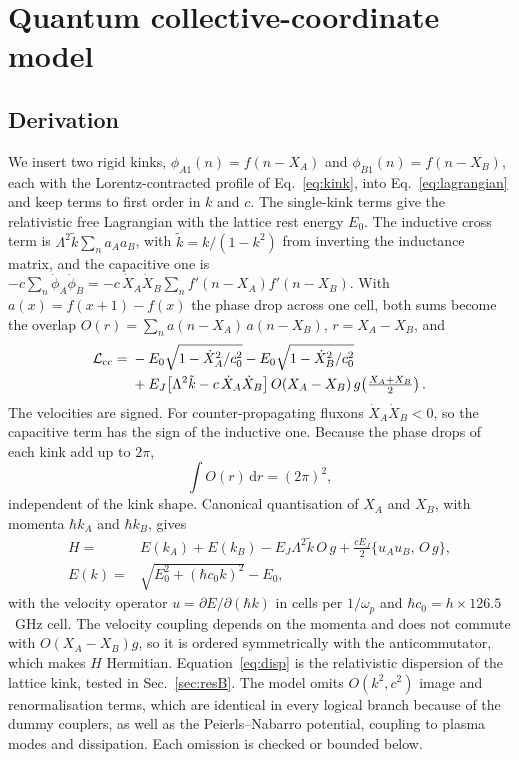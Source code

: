 \documentclass[10pt,twocolumn,letterpaper]{article}
\newcommand{\kt}{\tilde{k}}
\newcommand{\ud}{\mathrm{d}}
\begin{document}
\section{Quantum collective-coordinate model}
\label{sec:quantum}

\subsection{Derivation}
We insert two rigid kinks, $\phi_{A1}(n)=f(n-X_A)$ and $\phi_{B1}(n)=f(n-X_B)$, each with the Lorentz-contracted
profile of Eq.~\eqref{eq:kink}, into Eq.~\eqref{eq:lagrangian} and keep terms to first order in $k$ and $c$. The
single-kink terms give the relativistic free Lagrangian with the lattice rest energy $E_0$. The inductive cross term is
$\Lambda^2\kt\sum_n a_Aa_B$, with $\kt=k/(1-k^2)$ from inverting the inductance matrix, and the capacitive one is
$-c\sum_n\dot\phi_A\dot\phi_B=-c\,\dot X_A\dot X_B\sum_n f'(n-X_A)f'(n-X_B)$. With $a(x)=f(x+1)-f(x)$ the phase drop
across one cell, both sums become the overlap $O(r)=\sum_n a(n-X_A)\,a(n-X_B)$, $r=X_A-X_B$, and
\begin{align}
\mathcal L_{\rm cc}={}&-E_0\sqrt{1-\dot X_A^2/c_0^2}-E_0\sqrt{1-\dot X_B^2/c_0^2}\nonumber\\
&+E_J\big[\Lambda^2\kt-c\,\dot X_A\dot X_B\big]\,O(X_A-X_B)\,g\!\left(\tfrac{X_A+X_B}{2}\right).
\label{eq:Lcc}
\end{align}
The velocities are signed. For counter-propagating fluxons $\dot X_A\dot X_B<0$, so the capacitive term has the sign
of the inductive one. Because the phase drops of each kink add up to $2\pi$,
\begin{equation}
\int O(r)\,\ud r=(2\pi)^2 ,
\label{eq:sumrule}
\end{equation}
independent of the kink shape. Canonical quantisation of $X_A$ and $X_B$, with momenta $\hbar k_A$ and $\hbar k_B$,
gives
\begin{align}
H={}&E(k_A)+E(k_B)-E_J\Lambda^2\kt\,O\,g+\frac{cE_J}{2}\big\{u_Au_B,\,O\,g\big\},\label{eq:H}\\
E(k)={}&\sqrt{E_0^2+(\hbar c_0k)^2}-E_0 ,\label{eq:disp}
\end{align}
with the velocity operator $u=\partial E/\partial(\hbar k)$ in cells per $1/\omega_p$ and $\hbar c_0=h\times126.5$~GHz
cell. The velocity coupling depends on the momenta and does not commute with $O(X_A-X_B)g$, so it is ordered
symmetrically with the anticommutator, which makes $H$ Hermitian. Equation~\eqref{eq:disp} is the relativistic
dispersion of the lattice kink, tested in Sec.~\ref{sec:resB}. The model omits $O(k^2,c^2)$ image and renormalisation
terms, which are identical in every logical branch because of the dummy couplers, as well as the Peierls--Nabarro
potential, coupling to plasma modes and dissipation. Each omission is checked or bounded below.
\end{document}
